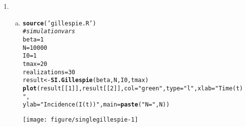 \documentclass[12pt]{article}\usepackage[]{graphicx}\usepackage[]{color}
\makeatletter
\def\maxwidth{ %
  \ifdim\Gin@nat@width>\linewidth
    \linewidth
  \else
    \Gin@nat@width
  \fi
}
\newcommand{\hlnum}[1]{\textcolor[rgb]{0.686,0.059,0.569}{#1}}%
\newcommand{\hlstr}[1]{\textcolor[rgb]{0.192,0.494,0.8}{#1}}%
\newcommand{\hlcom}[1]{\textcolor[rgb]{0.678,0.584,0.686}{\textit{#1}}}%
\newcommand{\hlstd}[1]{\textcolor[rgb]{0.345,0.345,0.345}{#1}}%
\newcommand{\hlkwb}[1]{\textcolor[rgb]{0.69,0.353,0.396}{#1}}%
\newcommand{\hlkwc}[1]{\textcolor[rgb]{0.333,0.667,0.333}{#1}}%
\newcommand{\hlkwd}[1]{\textcolor[rgb]{0.737,0.353,0.396}{\textbf{#1}}}%
\newenvironment{kframe}{%
 \def\at@end@of@kframe{}%
 \ifinner\ifhmode%
  \def\at@end@of@kframe{\end{minipage}}%
  \begin{minipage}{\columnwidth}%
 \fi\fi%
 \def\FrameCommand##1{\hskip\@totalleftmargin \hskip-\fboxsep
 \colorbox{shadecolor}{##1}\hskip-\fboxsep
     \hskip-\linewidth \hskip-\@totalleftmargin \hskip\columnwidth}%
 \MakeFramed {\advance\hsize-\width
   \@totalleftmargin\z@ \linewidth\hsize
   \@setminipage}}%
 {\par\unskip\endMakeFramed%
 \at@end@of@kframe}
\newenvironment{knitrout}{}{} %
\makeatother
\begin{document}
\begin{enumerate}
\begin{enumerate}[(a)]
\begin{center}
{\Large London Influenza Time Series}
\end{center}
\begin{knitrout}
\color{fgcolor}\begin{kframe}
\begin{verbatim}
## [1] 1357 2288 2660
## [1] 1357
## [1] 932
## [1] 373
\end{verbatim}
\end{kframe}

{\centering \texttt{[image: figure/London-1]} 

}



\end{knitrout}
\begin{center}
{\Large Liverpool Influenza Time Series}
\end{center}
\begin{knitrout}
\color{fgcolor}\begin{kframe}
\begin{verbatim}
## [1] 1197 1809 2341 2660
## [1] 1197
## [1] 613
## [1] 533
## [1] 320
\end{verbatim}
\end{kframe}

{\centering \texttt{[image: figure/Liverpool-1]} 

}



\end{knitrout}
    \end{enumerate}
    \item \SEintro
    \begin{enumerate}[(a)]
        \item

\begin{knitrout}
\color{fgcolor}\begin{kframe}
\begin{alltt}
\hlkwd{source}\hlstd{(}\hlstr{'gillespie.R'}\hlstd{)}
\hlcom{#simulation vars}
\hlstd{beta} \hlkwb{=} \hlnum{1}
\hlstd{N} \hlkwb{=} \hlnum{10000}
\hlstd{I0} \hlkwb{=} \hlnum{1}
\hlstd{tmax} \hlkwb{=} \hlnum{20}
\hlstd{realizations} \hlkwb{=} \hlnum{30}
\hlstd{result} \hlkwb{<-} \hlkwd{SI.Gillespie}\hlstd{(beta,N,I0,tmax)}
\hlkwd{plot}\hlstd{(result[[}\hlnum{1}\hlstd{]], result[[}\hlnum{2}\hlstd{]],} \hlkwc{col}\hlstd{=}\hlstr{"green"}\hlstd{,} \hlkwc{type}\hlstd{=}\hlstr{"l"}\hlstd{,} \hlkwc{xlab}\hlstd{=}\hlstr{"Time (t)"}\hlstd{,}
     \hlkwc{ylab}\hlstd{=}\hlstr{"Incidence (I(t))"}\hlstd{,} \hlkwc{main}\hlstd{=}\hlkwd{paste}\hlstd{(}\hlstr{"N ="}\hlstd{,N))}
\end{alltt}
\end{kframe}
\texttt{[image: figure/singlegillespie-1]} 


\end{knitrout}
\end{enumerate}
\end{enumerate}
\end{document}
